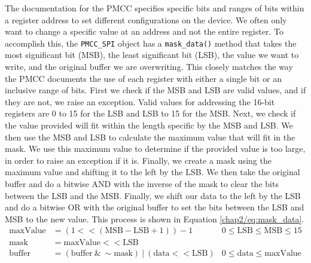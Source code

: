 The documentation for the PMCC specifies specific bits and ranges of bits within a register address to set different configurations on the device.
We often only want to change a specific value at an address and not the entire register.
To accomplish this, the \texttt{PMCC\_SPI} object has a \texttt{mask\_data()} method that takes the most significant bit (MSB), the least significant bit (LSB), the value we want to write, and the original buffer we are overwriting.
This closely matches the way the PMCC documents the use of each register with either a single bit or an inclusive range of bits. 
First we check if the MSB and LSB are valid values, and if they are not, we raise an exception.
Valid values for addressing the 16-bit registers are 0 to 15 for the LSB and LSB to 15 for the MSB.
Next, we check if the value provided will fit within the length specific by the MSB and LSB.
We then use the MSB and LSB to calculate the maximum value that will fit in the mask. 
We use this maximum value to determine if the provided value is too large, in order to raise an exception if it is.
Finally, we create a mask using the maximum value and shifting it to the left by the LSB.
We then take the original buffer and do a bitwise AND with the inverse of the mask to clear the bits between the LSB and the MSB. 
Finally, we shift our data to the left by the LSB and do a bitwise OR with the original buffer to set the bits between the LSB and MSB to the new value.
This process is shown in Equation \ref{chap2/eq:mask_data}.
\begin{align}
    \label{chap2/eq:mask_data}
    \text{maxValue} &= (1 << (\text{MSB} - \text{LSB} + 1)) - 1 & 0 \leq \text{LSB} \leq \text{MSB} \leq 15\\
    \text{mask} &= \text{maxValue} << \text{LSB} \\
    \text{buffer} &= (\text{buffer}\ \&\ \sim\text{mask})\ |\ (\text{data} << \text{LSB}) & 0 \leq \text{data} \leq \text{maxValue}
\end{align}


